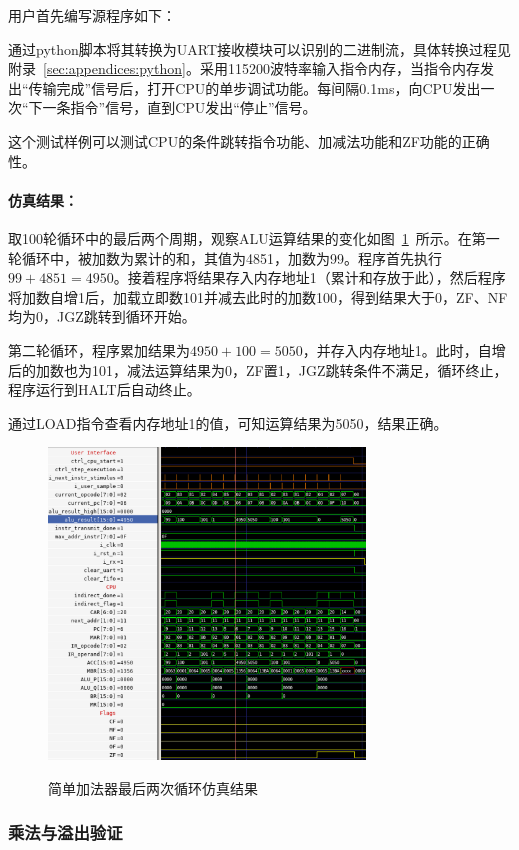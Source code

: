 \documentclass[lang=cn,a4paper,newtx]{elegantpaper}
\begin{document}
用户首先编写源程序如下：


通过python脚本将其转换为UART接收模块可以识别的二进制流，具体转换过程见附录~\ref{sec:appendices:python}。采用115200波特率输入指令内存，当指令内存发出“传输完成”信号后，打开CPU的单步调试功能。每间隔0.1ms，向CPU发出一次“下一条指令”信号，直到CPU发出“停止”信号。

这个测试样例可以测试CPU的条件跳转指令功能、加减法功能和ZF功能的正确性。
\paragraph{仿真结果：}
取100轮循环中的最后两个周期，观察ALU运算结果的变化如图~\ref{fig:sim:1}~所示。在第一轮循环中，被加数为累计的和，其值为4851，加数为99。程序首先执行$99 +4851 = 4950$。接着程序将结果存入内存地址1（累计和存放于此），然后程序将加数自增1后，加载立即数101并减去此时的加数100，得到结果大于0，ZF、NF均为0，JGZ跳转到循环开始。

第二轮循环，程序累加结果为$4950+100 = 5050$，并存入内存地址1。此时，自增后的加数也为101，减法运算结果为0，ZF置1，JGZ跳转条件不满足，循环终止，程序运行到HALT后自动终止。

通过LOAD指令查看内存地址1的值，可知运算结果为5050，结果正确。

\begin{figure}[htbp]
  \centering
  \caption{简单加法器最后两次循环仿真结果}
  \includegraphics[width = 0.75\textwidth]{figure/cpu_sim_add.png}
  \label{fig:sim:1}
\end{figure}


\subsubsection{乘法与溢出验证}
\end{document}
